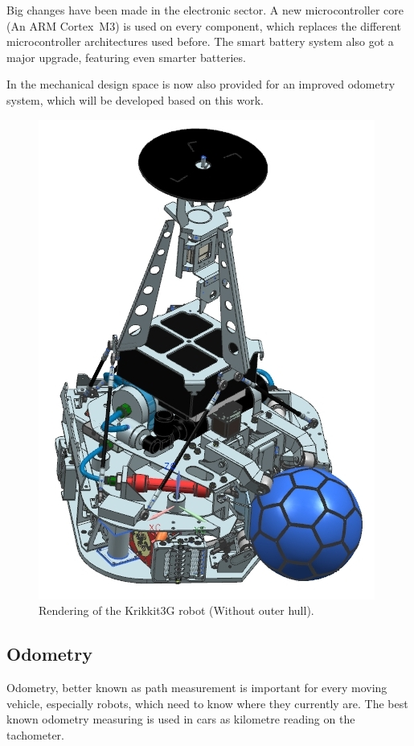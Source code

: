 \documentclass[12pt,a4paper]{article}
\begin{document}
Big changes have been made in the electronic sector.
A new microcontroller core (An ARM Cortex~M3) is used on every component, which replaces the different microcontroller architectures used before.
The smart battery system also got a major upgrade, featuring even smarter batteries.

In the mechanical design space is now also provided for an improved odometry system, which will be developed based on this work.


\begin{figure}[b]
\begin{center}  
\includegraphics[width=0.5\columnwidth]{figures/Krikkit3G.jpg}
\caption{\label{fig:krikkit3g}
Rendering of the Krikkit3G robot (Without outer hull).
}   
\end{center}
\end{figure}



\subsection{Odometry}


Odometry, better known as path measurement is important for every moving vehicle, especially robots, which need to know where they currently are. 
The best known odometry measuring is used in cars as kilometre reading on the tachometer.
\end{document}
